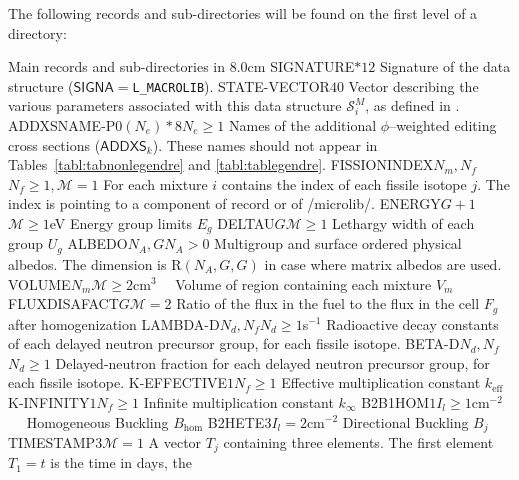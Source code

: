 The following records and sub-directories will be found on the first level of a 
directory:

\begin{DescriptionEnregistrement}{Main records and sub-directories in }{8.0cm}
\CharEnr
  {SIGNATURE}{$*12$}
  {Signature of the  data structure ($\mathsf{SIGNA}=${\tt L\_MACROLIB}).}
\IntEnr
  {STATE-VECTOR}{$40$}
  {Vector describing the various parameters associated with this data structure
  $\mathcal{S}^{M}_{i}$, as defined in .}
\OptCharEnr
  {ADDXSNAME-P0}{$(N_{e})*8$}{$N_{e} \ge 1$}
  {Names of the additional $\phi$--weighted editing cross sections ($\mathsf{ADDXS}_k$).
  These names should not appear in Tables~\ref{tabl:tabnonlegendre} and \ref{tabl:tablegendre}.}
\OptIntEnr
  {FISSIONINDEX}{$N_{m},N_{f}$}{$N_{f} \ge 1,\mathcal{M}=1$}
  {For each mixture $i$ contains the index of each fissile isotope $j$. The index is
   pointing to a component of record  or 
   of /microlib/.}
\OptRealEnr
  {ENERGY}{$G+1$}{$\mathcal{M}\ge 1$}{eV}
  {Energy group limits $E_{g}$}
\OptRealEnr
  {DELTAU}{$G$}{$\mathcal{M}\ge 1$}{}
  {Lethargy width of each group $U_{g}$}
\OptRealEnr
  {ALBEDO}{$N_{A}, G$}{$N_{A}> 0$}{}
  {Multigroup and surface ordered physical albedos. The dimension is R$(N_{A},G,G)$ in case where matrix albedos are used.}
\OptRealEnr
  {VOLUME}{$N_{m}$}{$\mathcal{M}\ge 2$}{cm$^{3}$~~}
  {Volume of region containing each mixture $V_{m}$}
\OptRealEnr
  {FLUXDISAFACT}{$G$}{$\mathcal{M}=2$}{}
  {Ratio of the flux in the fuel to the flux in the cell $F_{g}$ after homogenization}
\OptRealEnr
  {LAMBDA-D}{$N_{d},N_{f}$}{$N_{d}\ge 1$}{s$^{-1}$}
  {Radioactive decay constants of each delayed neutron precursor group, for each
  fissile isotope.}
\OptRealEnr
  {BETA-D}{$N_{d},N_{f}$}{$N_{d}\ge 1$}{}
  {Delayed-neutron fraction for each delayed neutron precursor group, for each
  fissile isotope.}
\OptRealEnr
  {K-EFFECTIVE}{$1$}{$N_{f} \ge 1$}{}
  {Effective multiplication constant $k_{\mathrm{eff}}$}
\OptRealEnr
  {K-INFINITY}{$1$}{$N_{f} \ge 1$}{}
  {Infinite multiplication constant $k_{\infty}$}
\OptRealEnr
  {B2B1HOM}{$1$}{$I_{l} \ge 1$}{cm$^{-2}$~~}
  {Homogeneous Buckling $B_{\mathrm{hom}}$}
\OptRealEnr
  {B2HETE}{$3$}{$I_{l}=2$}{cm$^{-2}$}
  {Directional Buckling $B_{j}$}
\OptRealEnr
  {TIMESTAMP}{$3$}{$\mathcal{M}=1$}{}
  {A vector $T_{j}$ containing three elements. The first element $T_{1}=t$ is the time in days, the
}
\end{DescriptionEnregistrement}
